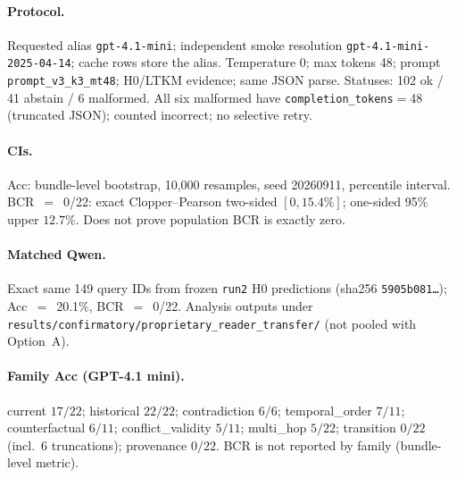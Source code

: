 \paragraph{Protocol.} Requested alias \texttt{gpt-4.1-mini}; independent smoke resolution \texttt{gpt-4.1-mini-2025-04-14}; cache rows store the alias. Temperature 0; max tokens 48; prompt \texttt{prompt\_v3\_k3\_mt48}; H0/LTKM evidence; same JSON parse. Statuses: 102 ok / 41 abstain / 6 malformed. All six malformed have \texttt{completion\_tokens}$=$48 (truncated JSON); counted incorrect; no selective retry.

\paragraph{CIs.} Acc: bundle-level bootstrap, 10{,}000 resamples, seed 20260911, percentile interval. BCR~$=$~0/22: exact Clopper--Pearson two-sided $[0,15.4\%]$; one-sided 95\% upper $12.7\%$. Does not prove population BCR is exactly zero.

\paragraph{Matched Qwen.} Exact same 149 query IDs from frozen \texttt{run2} H0 predictions (sha256 \texttt{5905b081\ldots}); Acc~$=$~20.1\%, BCR~$=$~0/22. Analysis outputs under \texttt{results/confirmatory/proprietary\_reader\_transfer/} (not pooled with Option~A).

\paragraph{Family Acc (GPT-4.1 mini).} current $17/22$; historical $22/22$; contradiction $6/6$; temporal\_order $7/11$; counterfactual $6/11$; conflict\_validity $5/11$; multi\_hop $5/22$; transition $0/22$ (incl.\ 6 truncations); provenance $0/22$. BCR is not reported by family (bundle-level metric).


